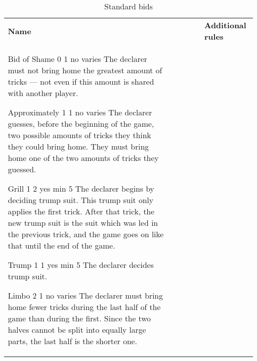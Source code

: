 %
%
%
%

\begin{table}
	\caption{Standard bids}\label{tab:standardBids}
	\begin{center}
		\begin{tabularx}{\textwidth}{
			l
			S[table-number-alignment=center, table-format=1.0]
			S[table-number-alignment=center, table-format=1.0]
			cc|X
		}
				\textbf{Name} &
				 &
				 &
				 &
				 &
				\textbf{Additional rules}
				\\[-3ex]

				\standardBidItem%
				{Bid of Shame}
				{0}
				{1}
				{no}
				{varies}
				{%
					The declarer must not bring home the greatest amount of tricks --- not even if this amount is shared with another player.
				}

				\standardBidItem%
				{Approximately}
				{1}
				{1}
				{no}
				{varies}
				{%
					The declarer guesses, before the beginning of the game, two possible amounts of tricks they think they could bring home. They must bring home one of the two amounts of tricks they guessed.
				}

				\standardBidItem%
				{Grill}
				{1}
				{2}
				{yes}
				{min 5}
				{%
					The declarer begins by deciding trump suit. This trump suit only applies the first trick. After that trick, the new trump suit is the suit which was led in the previous trick, and the game goes on like that until the end of the game.
				}

				\standardBidItem%
				{Trump}
				{1}
				{1}
				{yes}
				{min 5}
				{%
					The declarer decides trump suit.
				}

				\standardBidItem%
				{Limbo}
				{2}
				{1}
				{no}
				{varies}
				{%
					The declarer must bring home fewer tricks during the last half of the game than during the first. Since the two halves cannot be split into equally large parts, the last half is the shorter one.
				}
				

\end{tabularx}
\end{center}
\end{table}
